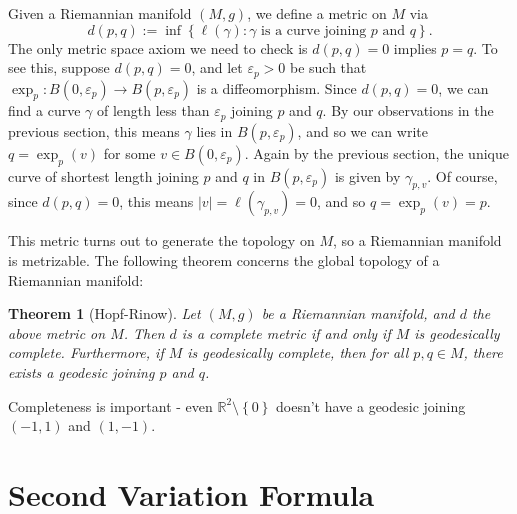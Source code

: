 \documentclass{book}
\newcommand{\bbR}{\mathbb{R}}
\renewcommand{\epsilon}{\varepsilon}
\newcommand{\abs}[1]{\left\lvert {#1} \right\rvert}
\newcommand{\set}[1]{\left\{ {#1} \right\}}
\newtheorem{theorem}{Theorem}[section]
\theoremstyle{definition}
\numberwithin{equation}{section}
\begin{document}
Given a Riemannian manifold $(M,g)$, we define a metric on $M$ via 
\begin{equation}
    d(p,q) := \inf\set{ \ell(\gamma) : \gamma \text{ is a curve joining } p \text{ and } q }.
\end{equation}
The only metric space axiom we need to check is $d(p,q) = 0$ implies $p = q$. To see this, suppose $d(p,q) = 0$, and let $\epsilon_p > 0$ be such that $\exp_p \colon B(0,\epsilon_p) \to B(p,\epsilon_p)$ is a diffeomorphism. Since $d(p,q) = 0$, we can find a curve $\gamma$ of length less than $\epsilon_p$ joining $p$ and $q$. By our observations in the previous section, this means $\gamma$ lies in $B(p,\epsilon_p)$, and so we can write $q = \exp_p(v)$ for some $v \in B(0,\epsilon_p)$. Again by the previous section, the unique curve of shortest length joining $p$ and $q$ in $B(p,\epsilon_p)$ is given by $\gamma_{p,v}$. Of course, since $d(p,q) = 0$, this means $\abs{v} = \ell(\gamma_{p,v}) = 0$, and so $q = \exp_p(v) = p$.

This metric turns out to generate the topology on $M$, so a Riemannian manifold is metrizable. The following theorem concerns the global topology of a Riemannian manifold:
\begin{theorem}[Hopf-Rinow]
    Let $(M,g)$ be a Riemannian manifold, and $d$ the above metric on $M$. Then $d$ is a complete metric if and only if $M$ is geodesically complete. Furthermore, if $M$ is geodesically complete, then for all $p,q \in M$, there exists a geodesic joining $p$ and $q$.
\end{theorem}
Completeness is important - even $\bbR^2 \setminus \set{0}$ doesn't have a geodesic joining $(-1,1)$ and $(1,-1)$.


\section{Second Variation Formula}
\end{document}
